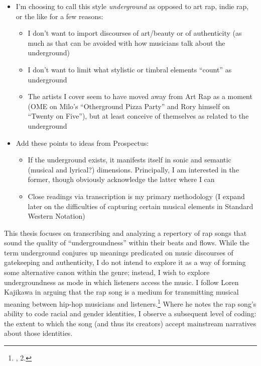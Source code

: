 \begin{itemize}
    \item I'm choosing to call this style \emph{underground} as opposed to art rap, indie rap, or the like
    for a few reasons:
        \begin{itemize}
            \item I don't want to import discourses of art/beauty or of authenticity (as much as that can 
            be avoided with how musicians talk about the underground)
            \item I don't want to limit what stylistic or timbral elements ``count'' as underground
            \item The artists I cover seem to have moved away from Art Rap as a moment (OME on Milo's
            ``Otherground Pizza Party'' and Rory himself on ``Twenty on Five''), but at least conceive of
            themselves as related to the underground 
        \end{itemize}
    \item Add these points to ideas from Prospectus:
        \begin{itemize}
            \item If the underground exists, it manifests itself in sonic and semantic (musical and lyrical?)
            dimensions. Principally, I am interested in the former, though obviously acknowledge the latter
            where I can
            \item Close readings via transcription is my primary methodology (I expand later on the
            difficulties of capturing certain musical elements in Standard Western Notation)
        \end{itemize}
\end{itemize}

This thesis focuses on transcribing and analyzing a repertory of rap songs that sound
the quality of ``undergroundness'' within their beats and flows. While the term underground 
conjures up meanings predicated on music discourses of gatekeeping and authenticity, I do 
not intend to explore it as a way of forming some alternative canon within the genre; instead, 
I wish to explore undergroundness as mode in which listeners access the music. I follow Loren 
Kajikawa in arguing that the rap song is a medium for transmitting musical meaning between 
hip-hop musicians and listeners.\footnote{\cite{lorenkajikawaSoundingRaceRap2015}, 2.} Where 
he notes the rap song's ability to code racial and gender identities, I observe a subsequent 
level of coding: the extent to which the song (and thus its creators) accept mainstream narratives 
about those identities.

